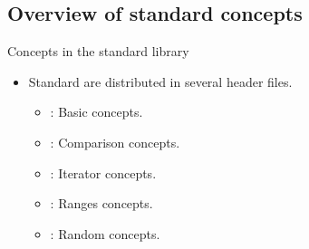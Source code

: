 \subsection{Overview of standard concepts}

\begin{frame}[t,fragile]{Concepts in the standard library}
\begin{itemize}
  \item Standard  are distributed in several header files.
    \begin{itemize}
      \item {}: Basic concepts.
      \item {}: Comparison concepts.
      \item {}: Iterator concepts.
      \item {}: Ranges concepts.
      \item {}: Random concepts.
    \end{itemize}
\end{itemize}
\end{frame}

